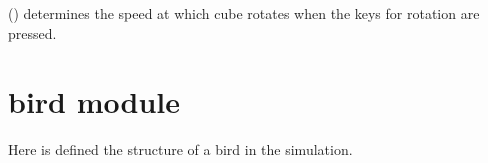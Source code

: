 \documentclass[a4paper,11pt,oneside,english]{sphinxmanual}
\begin{document}
\bigskip
\bigskip 



\begin{fulllineitems}
() determines the speed at which cube rotates when the keys for rotation are pressed.

\end{fulllineitems}



\chapter{bird module}
\label{\detokenize{bird:module-bird}}\label{\detokenize{bird:bird-module}}\label{\detokenize{bird::doc}}\label{\detokenize{bird:module-0}}
Here is defined the structure of a bird in the simulation.

\bigskip 
\bigskip 

\end{document}
